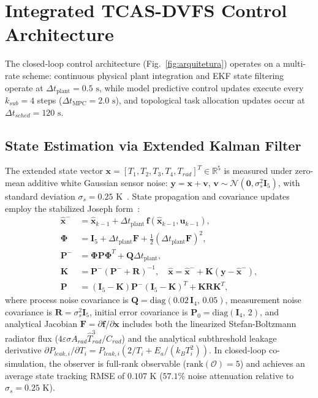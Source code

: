 \documentclass[a4paper,fleqn]{cas-dc}
\begin{document}
\section{Integrated TCAS-DVFS Control Architecture}
\label{sec:control}

The closed-loop control architecture (Fig.~\ref{fig:arquitetura}) operates on a multi-rate scheme: continuous physical plant integration and EKF state filtering operate at $\Delta t_{\text{plant}} = 0.5\text{ s}$, while model predictive control updates execute every $k_{sub} = 4$ steps ($\Delta t_{\text{MPC}} = 2.0\text{ s}$), and topological task allocation updates occur at $\Delta t_{sched} = 120\text{ s}$.

\subsection{State Estimation via Extended Kalman Filter}
The extended state vector $\mathbf{x} = [T_1, T_2, T_3, T_4, T_{rad}]^T \in \mathbb{R}^5$ is measured under zero-mean additive white Gaussian sensor noise: $\mathbf{y} = \mathbf{x} + \mathbf{v}$, $\mathbf{v} \sim \mathcal{N}(\mathbf{0}, \sigma_s^2\mathbf{I}_5)$, with standard deviation $\sigma_s = 0.25\text{ K}$~\citep{zhang2011tvlsi}. State propagation and covariance updates employ the stabilized Joseph form~\citep{simon2006optimal}:
\begin{align}
\hat{\mathbf{x}}^- &= \hat{\mathbf{x}}_{k-1} + \Delta t_{\text{plant}}\, \mathbf{f}(\hat{\mathbf{x}}_{k-1}, \mathbf{u}_{k-1}), \\
\boldsymbol{\Phi} &= \mathbf{I}_5 + \Delta t_{\text{plant}}\mathbf{F} + \tfrac{1}{2}(\Delta t_{\text{plant}}\mathbf{F})^2, \\
\mathbf{P}^- &= \boldsymbol{\Phi}\mathbf{P}\boldsymbol{\Phi}^T + \mathbf{Q}\Delta t_{\text{plant}}, \\
\mathbf{K} &= \mathbf{P}^-(\mathbf{P}^- + \mathbf{R})^{-1}, \quad \hat{\mathbf{x}} = \hat{\mathbf{x}}^- + \mathbf{K}(\mathbf{y} - \hat{\mathbf{x}}^-), \\
\mathbf{P} &= (\mathbf{I}_5-\mathbf{K})\mathbf{P}^-(\mathbf{I}_5-\mathbf{K})^T + \mathbf{K}\mathbf{R}\mathbf{K}^T,
\end{align}
where process noise covariance is $\mathbf{Q} = \mathrm{diag}(0.02\,\mathbf{I}_4,\, 0.05)$, measurement noise covariance is $\mathbf{R} = \sigma_s^2 \mathbf{I}_5$, initial error covariance is $\mathbf{P}_0 = \mathrm{diag}(\mathbf{I}_4,\, 2)$, and analytical Jacobian $\mathbf{F} = \partial \mathbf{f}/\partial \mathbf{x}$ includes both the linearized Stefan-Boltzmann radiator flux ($4\varepsilon\sigma A_{rad} \hat{T}_{rad}^3 / C_{rad}$) and the analytical subthreshold leakage derivative $\partial P_{leak,i}/\partial T_i = P_{leak,i}(2/T_i + E_a/(k_B T_i^2))$. In closed-loop co-simulation, the observer is full-rank observable ($\mathrm{rank}(\mathcal{O}) = 5$) and achieves an average state tracking RMSE of $0.107\text{ K}$ ($57.1\%$ noise attenuation relative to $\sigma_s = 0.25\text{ K}$).
\end{document}
